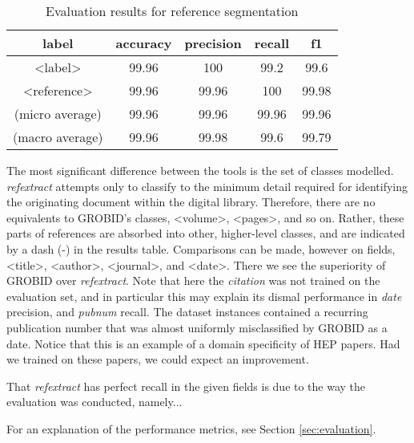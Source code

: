 \label{subsec:refextract}
\begin{table}[h]
\begin{center}
\begin{tabular}{|c|cccc|}
\hline
label           & accuracy  & precision  & recall   & f1 \\
\hline
<label>         & 99.96     & 100        & 99.2     & 99.6\\
<reference>     & 99.96     & 99.96      & 100      & 99.98\\
\hline
(micro average) & 99.96     & 99.96      & 99.96    & 99.96  \\
(macro average) & 99.96     & 99.98      & 99.6     & 99.79  \\
\hline
\end{tabular}
\caption[Evaluation results for reference segmentation]{Evaluation results for reference segmentation}
\label{table:referencesegmenterresults}
\end{center}
\end{table}

The most significant difference between the tools is the set of classes modelled. \emph{refextract} attempts only to classify to the minimum detail required for identifying the originating document within the digital library. Therefore, there are no equivalents to GROBID's classes, <volume>, <pages>, and so on. Rather, these parts of references are absorbed into other, higher-level classes, and are indicated by a dash (-) in the results table. Comparisons can be made, however on fields, <title>, <author>, <journal>, and <date>. There we see the superiority of GROBID over \emph{refextract}. Note that here the \emph{citation} was not trained on the evaluation set, and in particular this may explain its dismal performance in \emph{date} precision, and \emph{pubnum} recall. The dataset instances contained a recurring publication number that was almost uniformly misclassified by GROBID as a date. Notice that this is an example of a domain specificity of HEP papers. Had we trained on these papers, we could expect an improvement.

That \emph{refextract} has perfect recall in the given fields is due to the way the evaluation was conducted, namely...

For an explanation of the performance metrics, see Section \ref{sec:evaluation}.

